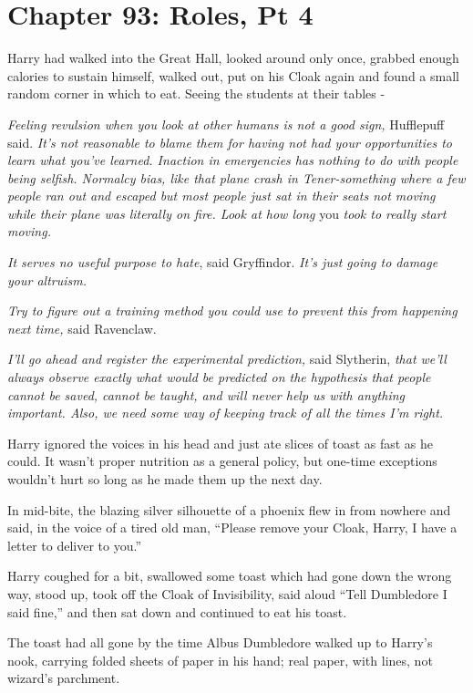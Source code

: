 \chapter{Chapter 93: Roles, Pt 4}
Harry had walked into the Great Hall, looked around only once, grabbed
enough calories to sustain himself, walked out, put on his Cloak again
and found a small random corner in which to eat. Seeing the students at
their tables -

\emph{Feeling revulsion when you look at other humans is not a good
sign,} Hufflepuff said. \emph{It's not reasonable to blame them for
having not had your opportunities to learn what you've learned. Inaction
in emergencies has nothing to do with people being selfish. Normalcy
bias, like that plane crash in Tener-something where a few people ran
out and escaped but most people just sat in their seats not moving while
their plane was literally on fire. Look at how long} you \emph{took to
really start moving.}

\emph{It serves no useful purpose to hate}, said Gryffindor. \emph{It's
just going to damage your altruism.}

\emph{Try to figure out a training method you could use to prevent this
from happening next time,} said Ravenclaw.

\emph{I'll go ahead and register the experimental prediction,} said
Slytherin, \emph{that we'll always observe exactly what would be
predicted on the hypothesis that people cannot be saved, cannot be
taught, and will never help us with anything important. Also, we need
some way of keeping track of all the times I'm right.}

Harry ignored the voices in his head and just ate slices of toast as
fast as he could. It wasn't proper nutrition as a general policy, but
one-time exceptions wouldn't hurt so long as he made them up the next
day.

In mid-bite, the blazing silver silhouette of a phoenix flew in from
nowhere and said, in the voice of a tired old man, ``Please remove your
Cloak, Harry, I have a letter to deliver to you.''

Harry coughed for a bit, swallowed some toast which had gone down the
wrong way, stood up, took off the Cloak of Invisibility, said aloud
``Tell Dumbledore I said fine,'' and then sat down and continued to eat
his toast.

The toast had all gone by the time Albus Dumbledore walked up to Harry's
nook, carrying folded sheets of paper in his hand; real paper, with
lines, not wizard's parchment.

